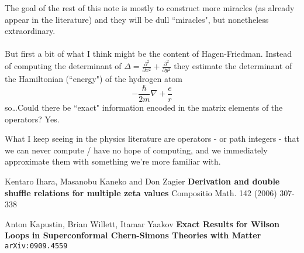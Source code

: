 \documentclass[12pt]{article}
\begin{document}
The goal of the rest of this note is mostly to construct more miracles (as already appear in the literature) and they will be dull ``miracles", but nonetheless extraordinary.  \\ \\
But first a bit of what I think might be the content of Hagen-Friedman.  Instead of computing the determinant of $\Delta = \frac{\partial^2}{\partial x^2}+\frac{\partial^2}{\partial y^2} $ they estimate the determinant of the Hamiltonian (``energy") of the hydrogen atom
$$ - \frac{\hbar}{2m}\nabla  + \frac{e}{r} $$
so\dots Could there be ``exact" information encoded in the matrix elements of the operators? Yes.

\newpage

\noindent What I keep seeing in the physics literature are operators - or path integers - that we can never compute / have no hope of computing, and we immediately approximate them with something we're more familiar with.

\vfill

\begin{thebibliography}{}

\item Kentaro Ihara, Masanobu Kaneko and Don Zagier \textbf{Derivation and double shuffle relations for multiple zeta values} Compositio Math. 142 (2006) 307-338

\item Anton Kapustin, Brian Willett, Itamar Yaakov \textbf{Exact Results for Wilson Loops in Superconformal Chern-Simons Theories with Matter} \texttt{arXiv:0909.4559}

\end{thebibliography}
\end{document}
